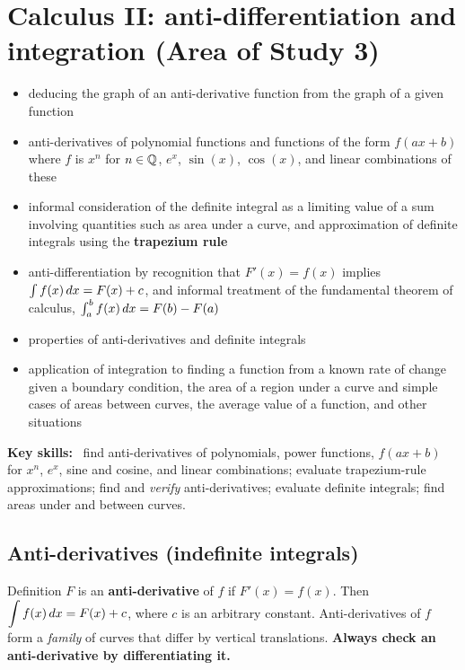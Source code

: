 \section{Calculus II: anti-differentiation and integration (Area of Study 3)}
\label{sec:int}

\begin{sdbox}
\begin{itemize}
  \item deducing the graph of an anti-derivative function from the graph of a given function
  \item anti-derivatives of polynomial functions and functions of the form $f(ax+b)$ where $f$ is $x^n$ for $n\in\mathbb{Q}$, $e^x$, $\sin(x)$, $\cos(x)$, and linear combinations of these
  \item informal consideration of the definite integral as a limiting value of a sum involving quantities such as area under a curve, and approximation of definite integrals using the \textbf{trapezium rule}
  \item anti-differentiation by recognition that $F'(x)=f(x)$ implies $\int f(x)\,dx=F(x)+c$, and informal treatment of the fundamental theorem of calculus, $\int_a^bf(x)\,dx=F(b)-F(a)$
  \item properties of anti-derivatives and definite integrals
  \item application of integration to finding a function from a known rate of change given a boundary condition, the area of a region under a curve and simple cases of areas between curves, the average value of a function, and other situations
\end{itemize}
\textbf{Key skills:} \byhand\ find anti-derivatives of polynomials, power functions, $f(ax+b)$ for $x^n$, $e^x$, sine and cosine, and linear combinations; evaluate trapezium-rule approximations; find and \emph{verify} anti-derivatives; evaluate definite integrals; find areas under and between curves.
\end{sdbox}

\subsection{Anti-derivatives (indefinite integrals)}
\label{sec:antideriv}

\begin{defn}{Definition}
$F$ is an \textbf{anti-derivative} of $f$ if $F'(x)=f(x)$. Then $\displaystyle\int f(x)\,dx=F(x)+c$, where $c$ is an arbitrary constant. Anti-derivatives of $f$ form a \emph{family} of curves that differ by vertical translations. \textbf{Always check an anti-derivative by differentiating it.}
\end{defn}

